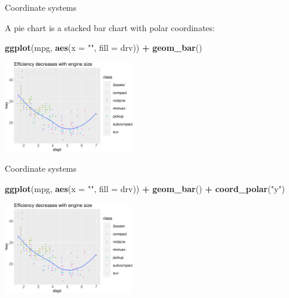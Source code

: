 \documentclass[ignorenonframetext,]{beamer}
\newenvironment{Shaded}{\begin{snugshade}}{\end{snugshade}}
\newcommand{\DataTypeTok}[1]{\textcolor[rgb]{0.13,0.29,0.53}{#1}}
\newcommand{\KeywordTok}[1]{\textcolor[rgb]{0.13,0.29,0.53}{\textbf{#1}}}
\newcommand{\NormalTok}[1]{#1}
\newcommand{\OperatorTok}[1]{\textcolor[rgb]{0.81,0.36,0.00}{\textbf{#1}}}
\newcommand{\StringTok}[1]{\textcolor[rgb]{0.31,0.60,0.02}{#1}}
\begin{document}
\begin{frame}[fragile]{Coordinate systems}
\protect\hypertarget{coordinate-systems-1}{}

A pie chart is a stacked bar chart with polar coordinates:

\begin{Shaded}
\begin{Highlighting}[]
\KeywordTok{ggplot}\NormalTok{(mpg, }\KeywordTok{aes}\NormalTok{(}\DataTypeTok{x =} \StringTok{""}\NormalTok{, }\DataTypeTok{fill =}\NormalTok{ drv)) }\OperatorTok{+}
\StringTok{  }\KeywordTok{geom_bar}\NormalTok{() }
\end{Highlighting}
\end{Shaded}

\begin{center}\includegraphics[height=150px]{data-visualization_files/figure-beamer/unnamed-chunk-146-1} \end{center}

\end{frame}

\begin{frame}[fragile]{Coordinate systems}
\protect\hypertarget{coordinate-systems-2}{}

\begin{Shaded}
\begin{Highlighting}[]
\KeywordTok{ggplot}\NormalTok{(mpg, }\KeywordTok{aes}\NormalTok{(}\DataTypeTok{x =} \StringTok{""}\NormalTok{, }\DataTypeTok{fill =}\NormalTok{ drv)) }\OperatorTok{+}
\StringTok{  }\KeywordTok{geom_bar}\NormalTok{() }\OperatorTok{+}
\StringTok{  }\KeywordTok{coord_polar}\NormalTok{(}\StringTok{"y"}\NormalTok{)}
\end{Highlighting}
\end{Shaded}

\begin{center}\includegraphics[height=150px]{data-visualization_files/figure-beamer/unnamed-chunk-147-1} \end{center}

\end{frame}
\end{document}
